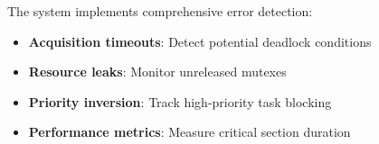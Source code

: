 \documentclass{article}
\begin{document}
The system implements comprehensive error detection:

\begin{itemize}
    \item \textbf{Acquisition timeouts}: Detect potential deadlock conditions
    \item \textbf{Resource leaks}: Monitor unreleased mutexes
    \item \textbf{Priority inversion}: Track high-priority task blocking
    \item \textbf{Performance metrics}: Measure critical section duration
\end{itemize}
\end{document}
